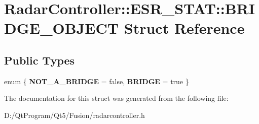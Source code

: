 \hypertarget{struct_radar_controller_1_1_e_s_r___s_t_a_t_1_1_b_r_i_d_g_e___o_b_j_e_c_t}{}\section{Radar\+Controller\+:\+:E\+S\+R\+\_\+\+S\+T\+A\+T\+:\+:B\+R\+I\+D\+G\+E\+\_\+\+O\+B\+J\+E\+C\+T Struct Reference}
\label{struct_radar_controller_1_1_e_s_r___s_t_a_t_1_1_b_r_i_d_g_e___o_b_j_e_c_t}
\subsection*{Public Types}
\begin{DoxyCompactItemize}
\item 
\hypertarget{struct_radar_controller_1_1_e_s_r___s_t_a_t_1_1_b_r_i_d_g_e___o_b_j_e_c_t_adb8a0e3dd70c6ad7394a16526aef26f1}{}enum \{ {\bfseries N\+O\+T\+\_\+\+A\+\_\+\+B\+R\+I\+D\+G\+E} = false, 
{\bfseries B\+R\+I\+D\+G\+E} = true
 \}\label{struct_radar_controller_1_1_e_s_r___s_t_a_t_1_1_b_r_i_d_g_e___o_b_j_e_c_t_adb8a0e3dd70c6ad7394a16526aef26f1}

\end{DoxyCompactItemize}


The documentation for this struct was generated from the following file\+:\begin{DoxyCompactItemize}
\item 
D\+:/\+Qt\+Program/\+Qt5/\+Fusion/radarcontroller.\+h\end{DoxyCompactItemize}
